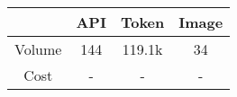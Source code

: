 
\begin{table}[!t]
    \centering
    \renewcommand{\arraystretch}{0.9}  %

    \begin{tabular}{cccc}
        \toprule
         & \textbf{API } & \textbf{Token} & \textbf{Image}\\
        \midrule
        Volume  & 144 & 119.1k & 34 \\ 
         Cost & - &- & - \\
        \bottomrule
    \end{tabular}
    \caption{}
    \label{tb:cost}
\end{table}
